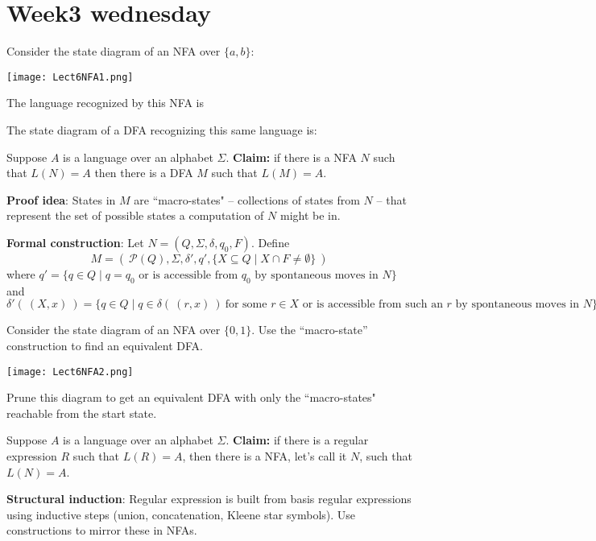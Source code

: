 \documentclass[12pt, oneside]{article}
\begin{document}
 \vfill
\section*{Week3 wednesday}



Consider the state diagram of an NFA over $\{a,b\}$:

\texttt{[image: Lect6NFA1.png]}


The language recognized by this NFA is



The state diagram of a DFA recognizing this same language is:

\vspace{70pt}
Suppose $A$ is a language over an alphabet $\Sigma$.
{\bf Claim:} if there is a NFA $N$ such that $L(N) = A$ then 
there is a DFA $M$ such that $L(M) = A$.

{\bf Proof idea}: States in $M$ are ``macro-states" -- collections of states from $N$ -- 
that represent the set of possible states a computation of $N$ might be in.


{\bf Formal construction}: Let $N = (Q, \Sigma, \delta, q_0, F)$.  Define 
\[
M = (~ \mathcal{P}(Q), \Sigma, \delta', q',  \{ X \subseteq Q \mid X \cap F \neq \emptyset \}~ )
\]
where $q' = \{ q \in Q \mid \text{$q = q_0$ or is accessible from $q_0$ by spontaneous moves in $N$} \}$
and 
\[
    \delta' (~(X, x)~) = \{ q \in Q \mid q \in \delta( ~(r,x)~) ~\text{for some $r \in X$ or is accessible 
from such an $r$ by spontaneous moves in $N$} \}
\]

\vfill

\newpage
Consider the state diagram of an NFA over $\{0,1\}$. Use the ``macro-state'' construction 
to find an equivalent DFA.


\texttt{[image: Lect6NFA2.png]}

\vspace{50pt}

Prune this diagram to get an 
equivalent DFA 
with only the ``macro-states" reachable from the start state.

\vspace{150pt}

Suppose $A$ is a language over an alphabet $\Sigma$.
{\bf Claim:} if there is a regular expression $R$ such that $L(R) = A$, then there is a NFA, let's call it $N$, such that 
$L(N) = A$.

{\bf Structural induction}: Regular expression is built from basis regular expressions using inductive steps
(union, concatenation, Kleene star symbols). Use constructions to mirror these in NFAs.
\end{document}
